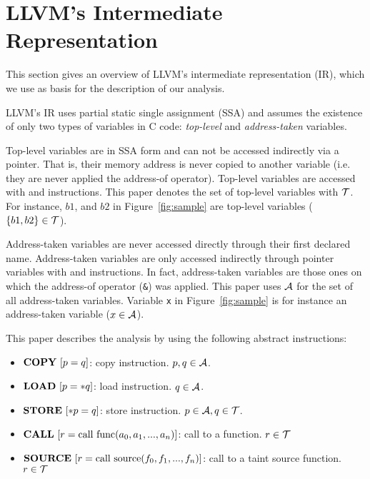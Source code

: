 \section{LLVM's Intermediate Representation}\label{sec:llvm}

This section gives an overview of LLVM's intermediate
representation (IR), which we use as basis for the
description of our analysis.

LLVM's IR uses partial static single assignment (SSA)
and assumes the existence of only two types of variables
in C code: \textit{top-level} and \textit{address-taken}
variables.

Top-level variables are in SSA form and can not be
accessed indirectly via a pointer. That is, their memory
address is never copied to another variable (i.e. they are
never applied the address-of operator). Top-level variables
are accessed with \alloct and \copyt instructions.
This paper denotes the set of top-level variables
with $\mathcal{T}$. For instance, $b1$, and $b2$ in Figure~\ref{fig:sample}
are top-level variables ($\{b1, b2\} \in \mathcal{T}$).

Address-taken variables are never accessed directly through
their first declared name. Address-taken variables are only
accessed indirectly through pointer variables with \loadt and
\storet instructions. In fact, address-taken variables
are those ones on which the address-of operator (\texttt{\&})
was applied. This paper uses $\mathcal{A}$ for the set of all address-taken
variables. Variable \texttt{x} in Figure~\ref{fig:sample} is
for instance an address-taken variable ($x \in \mathcal{A}$).

This paper describes the analysis by using the following abstract
instructions:
\begin{itemize}
\item $\text{\textbf{COPY}}\ [p = q]$: copy instruction. $p, q \in \mathcal{A}$.
\item $\text{\textbf{LOAD}}\ [p = *q]$: load instruction. $q \in \mathcal{A}$.
\item $\text{\textbf{STORE}}\ [*p = q]$: store instruction. $p \in \mathcal{A}, q \in \mathcal{T}$.
\item $\text{\textbf{CALL}}\ [r = \text{call}\ \text{func}(a_0, a_1, ..., a_n)]$: call to a function. $r \in \mathcal{T}$
\item $\text{\textbf{SOURCE}}\ [r = \text{call}\ \text{source}(f_0, f_1, ..., f_n)]$: call to a taint source function. $r \in \mathcal{T}$
\end{itemize}
